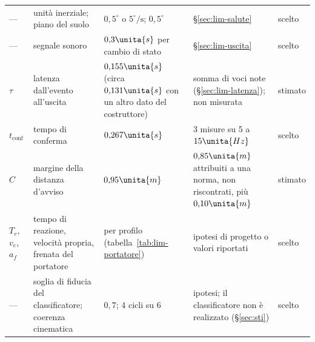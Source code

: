 \begin{table}[H]
\begin{tabularx}{\linewidth}{@{}p{1.25cm}Lp{3.5cm}Lp{1.2cm}@{}}
--- & unità inerziale; piano del suolo & $0{,}5^\circ$ o $5^\circ/\mathrm{s}$; $0{,}5^\circ$ & \S\ref{sec:lim-salute} & scelto\\
--- & segnale sonoro & $0{,}3\unita{s}$ per cambio di stato & \S\ref{sec:lim-uscita} & scelto\\
$\tau$ & latenza dall'evento all'uscita & $0{,}155\unita{s}$ (circa $0{,}131\unita{s}$ con un altro dato del costruttore) & somma di voci note (\S\ref{sec:lim-latenza}); non misurata & stimato\\
$t_{\mathrm{conf}}$ & tempo di conferma & $0{,}267\unita{s}$ & 3 misure su 5 a $15\unita{Hz}$ & scelto\\
$C$ & margine della distanza d'avviso & $0{,}95\unita{m}$ & $0{,}85\unita{m}$ attribuiti a una norma, non riscontrati, più $0{,}10\unita{m}$ & stimato\\
$T_r$, $v_e$, $a_f$ & tempo di reazione, velocità propria, frenata del portatore & per profilo (tabella~\ref{tab:lim-portatore}) & ipotesi di progetto o valori riportati & scelto\\
--- & soglia di fiducia del classificatore; coerenza cinematica & $0{,}7$; 4 cicli su 6 & ipotesi; il classificatore non è realizzato (\S\ref{sec:sti}) & scelto\\
\bottomrule
\end{tabularx}
\end{table}
